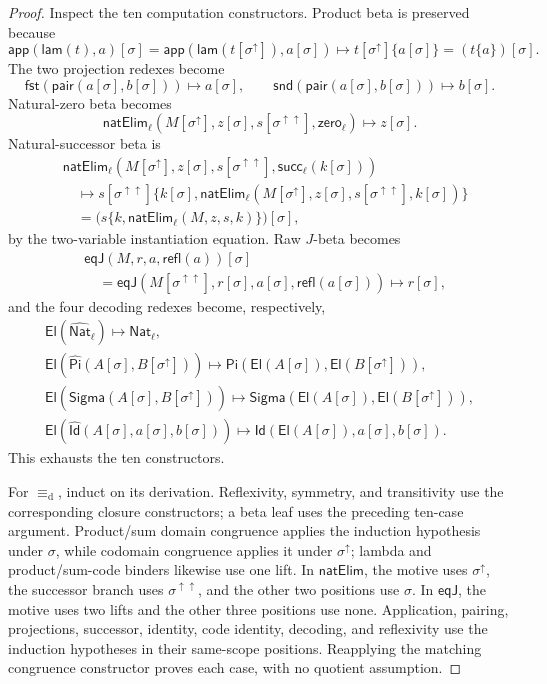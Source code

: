 \documentclass[10pt,reqno]{amsart}
\newcommand{\PiTy}{\mathsf{Pi}}
\newcommand{\SigmaTy}{\mathsf{Sigma}}
\newcommand{\Lam}{\mathsf{lam}}
\newcommand{\App}{\mathsf{app}}
\newcommand{\Pair}{\mathsf{pair}}
\newcommand{\Fst}{\mathsf{fst}}
\newcommand{\Snd}{\mathsf{snd}}
\newcommand{\NatTy}{\mathsf{Nat}}
\newcommand{\Zero}{\mathsf{zero}}
\newcommand{\Succ}{\mathsf{succ}}
\newcommand{\NatElim}{\mathsf{natElim}}
\newcommand{\CodeNat}{\widehat{\mathsf{Nat}}}
\newcommand{\CodePi}{\widehat{\mathsf{Pi}}}
\newcommand{\CodeSigma}{\widehat{\mathsf{Sigma}}}
\newcommand{\CodeId}{\widehat{\mathsf{Id}}}
\newcommand{\El}{\mathsf{El}}
\newcommand{\IdTy}{\mathsf{Id}}
\newcommand{\Refl}{\mathsf{refl}}
\newcommand{\EqJ}{\mathsf{eqJ}}
\newcommand{\defeq}{\mathrel{\equiv_{\mathrm d}}}
\newcommand{\red}{\mathrel{\longmapsto}}
\newcommand{\lift}{\uparrow}
\begin{document}
\begin{proof}
Inspect the ten computation constructors.  Product beta is preserved because
\[
\App(\Lam(t),a)[\sigma]
 =\App(\Lam(t[\sigma^\lift]),a[\sigma])
 \red t[\sigma^\lift]\{a[\sigma]\}
 =(t\{a\})[\sigma].
\]
The two projection redexes become
\[
\Fst(\Pair(a[\sigma],b[\sigma]))\red a[\sigma],
\qquad
\Snd(\Pair(a[\sigma],b[\sigma]))\red b[\sigma].
\]
Natural-zero beta becomes
\[
\NatElim_\ell(M[\sigma^\lift],z[\sigma],
 s[\sigma^{\lift\lift}],\Zero_\ell)\red z[\sigma].
\]
Natural-successor beta is
\[
\begin{aligned}
&\NatElim_\ell(M[\sigma^\lift],z[\sigma],
 s[\sigma^{\lift\lift}],\Succ_\ell(k[\sigma]))\\
&\quad\red
s[\sigma^{\lift\lift}]
 \{k[\sigma],
   \NatElim_\ell(M[\sigma^\lift],z[\sigma],
       s[\sigma^{\lift\lift}],k[\sigma])\}\\
&\quad=
\bigl(s\{k,\NatElim_\ell(M,z,s,k)\}\bigr)[\sigma],
\end{aligned}
\]
by the two-variable instantiation equation.  Raw \(J\)-beta becomes
\[
\begin{aligned}
&\EqJ(M,r,a,\Refl(a))[\sigma]\\
&\quad=
\EqJ(M[\sigma^{\lift\lift}],r[\sigma],a[\sigma],
     \Refl(a[\sigma]))
\red r[\sigma],
\end{aligned}
\]
and the four decoding redexes become, respectively,
\[
\begin{gathered}
\El(\CodeNat_\ell)\red\NatTy_\ell,\\
\El(\CodePi(A[\sigma],B[\sigma^\lift]))
 \red\PiTy(\El(A[\sigma]),\El(B[\sigma^\lift])),\\
\El(\CodeSigma(A[\sigma],B[\sigma^\lift]))
 \red\SigmaTy(\El(A[\sigma]),\El(B[\sigma^\lift])),\\
\El(\CodeId(A[\sigma],a[\sigma],b[\sigma]))
 \red\IdTy(\El(A[\sigma]),a[\sigma],b[\sigma]).
\end{gathered}
\]
This exhausts the ten constructors.

For \(\defeq\), induct on its derivation.  Reflexivity, symmetry, and
transitivity use the corresponding closure constructors; a beta leaf uses
the preceding ten-case argument.  Product/sum domain congruence applies the
induction hypothesis under \(\sigma\), while codomain congruence applies it
under \(\sigma^\lift\); lambda and product/sum-code binders likewise use one
lift.  In \(\NatElim\), the motive uses \(\sigma^\lift\), the successor
branch uses \(\sigma^{\lift\lift}\), and the other two positions use
\(\sigma\).  In \(\EqJ\), the motive uses two lifts and the other three
positions use none.  Application, pairing, projections, successor, identity,
code identity, decoding, and reflexivity use the induction hypotheses in
their same-scope positions.  Reapplying the matching congruence constructor
proves each case, with no quotient assumption.
\end{proof}
\end{document}

